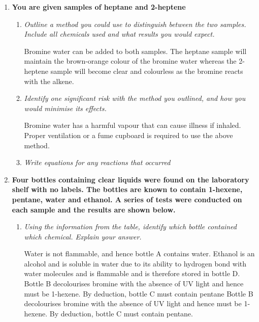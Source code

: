 \documentclass{report}
\begin{document}
\begin{enumerate}
		\item \textbf{You are given samples of heptane and 2-heptene}

			\begin{enumerate}
				\item \textit{Outline a method you could use to distinguish between the two samples. Include all chemicals used and what results you would expect.}

					Bromine water can be added to both samples. The heptane sample will maintain the brown-orange colour of the bromine water whereas the 2-heptene sample will become clear and colourless as the bromine reacts with the alkene.


				\item \textit{Identify one significant risk with the method you outlined, and how you would minimise its effects.}

					Bromine water has a harmful vapour that can cause illness if inhaled. Proper ventilation or a fume cupboard is required to use the above method.

				\item \textit{Write equations for any reactions that occurred}

					\begin{center}
					\end{center}
			\end{enumerate}

		\item \textbf{Four bottles containing clear liquids were found on the laboratory shelf with no labels. The bottles are known to contain 1-hexene, pentane, water and ethanol. A series of tests were conducted on each sample and the results are shown below.}

			\begin{enumerate}
				\item \textit{Using the information from the table, identify which bottle contained which chemical. Explain your answer.}

					Water is not flammable, and hence bottle A contains water. Ethanol is an alcohol and is soluble in water due to its ability to hydrogen bond with water molecules and is flammable and is therefore stored in bottle D. Bottle B decolourises bromine with the absence of UV light and hence must be 1-hexene. By deduction, bottle C must contain pentane Bottle B decolourises bromine with the absence of UV light and hence must be 1-hexene. By deduction, bottle C must contain pentane.


\end{enumerate}
\end{enumerate}
\end{document}
